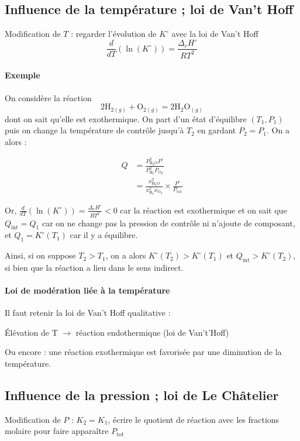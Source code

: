 \documentclass[french]{book}
\theoremstyle{plain}
\theoremstyle{definition}
\theoremstyle{remark}
\begin{document}
\subsection{Influence de la température ; loi de Van't Hoff}
Modification de $T$ : regarder l’évolution de $K^\circ$ avec la loi de Van’t Hoff $$\frac{d}{dT}\left(\ln(K^\circ)\right)=\frac{\Delta_rH^\circ}{RT^2}$$
\paragraph{Exemple} On considère la réaction $$2\text{H}_{2(g)}+\text{O}_{2(g)}=2\text{H}_2\text{O}_{(g)}$$ dont on sait qu'elle est exothermique. On part d'un état d'équilibre $(T_1,P_1)$ puis on change la température de contrôle jusqu'à $T_2$ en gardant $P_2=P_1$. On a alors : \begin{center}
	\begin{align*}
		Q&=\displaystyle\frac{P_{\text{H}_2\text{O}}^2P^\circ}{P_{\text{H}_2}^2P_{\text{O}_2}} \\
		&=\displaystyle\frac{x_{\text{H}_2\text{O}}^2}{x_{\text{H}_2}^2x_{\text{O}_2}}\times\frac{P^\circ}{P_\text{tot}}
	\end{align*}
\end{center}
Or, $\displaystyle\frac{d}{dT}\left(\ln\left(K^\circ\right)\right)=\frac{\Delta_rH^\circ}{RT^2}<0$ car la réaction est exothermique et on sait que $Q_\text{int}=Q_1$ car on ne change pas la pression de contrôle ni n'ajoute de composant, et $Q_1=K^\circ(T_1)$ car il y a équilibre. \\ \par  Ainsi, si on suppose $T_2>T_1$, on a alors $K^\circ(T_2)>K^\circ(T_1)$ et $Q_\text{int}>K^\circ(T_2)$, si bien que la réaction a lieu dans le sens indirect.
\paragraph{Loi de modération liée à la température} Il faut retenir la loi de Van't Hoff qualitative : 
\begin{center}
	Élévation de T $\to$ réaction endothermique (loi de Van’t’Hoff)
\end{center} Ou encore : une réaction exothermique est favorisée par une diminution de la température.
\subsection{Influence de la pression ; loi de Le Châtelier}
Modification de $P$ : $K_2=K_1$, écrire le quotient de réaction avec les fractions molaire pour faire apparaître $P_\text{tot}$
\end{document}
